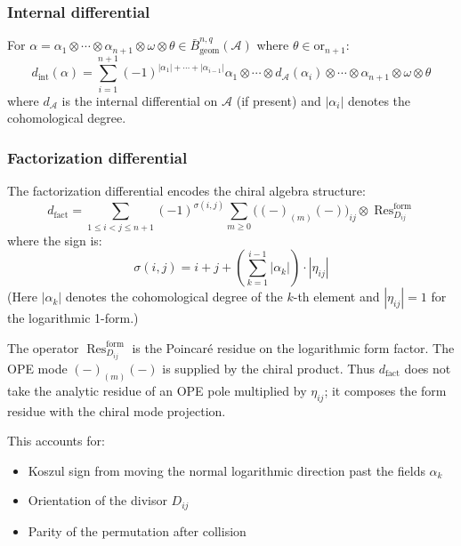\subsubsection{Internal differential}

\begin{definition}
For $\alpha = \alpha_1 \otimes \cdots \otimes \alpha_{n+1} \otimes \omega \otimes \theta \in
\bar{B}^{n,q}_{\text{geom}}(\mathcal{A})$ where $\theta \in \text{or}_{n+1}$:
\[
d_{\text{int}}(\alpha) = \sum_{i=1}^{n+1} (-1)^{|\alpha_1| + \cdots + |\alpha_{i-1}|}
\alpha_1 \otimes \cdots \otimes d_{\mathcal{A}}(\alpha_i) \otimes \cdots \otimes \alpha_{n+1} \otimes \omega \otimes \theta
\]
where $d_{\mathcal{A}}$ is the internal differential on $\mathcal{A}$ (if present) and $|\alpha_i|$ denotes
the cohomological degree.
\end{definition}

\subsubsection{Factorization differential}

\begin{definition}\label{def:diff-fact}
 The factorization differential encodes the chiral algebra structure:
 \[
 d_{\text{fact}}
 =
 \sum_{1 \leq i < j \leq n+1}
 (-1)^{\sigma(i,j)}
 \sum_{m\ge0}
 \bigl((-)_{(m)}(-)\bigr)_{ij}
 \otimes
 \operatorname{Res}^{\mathrm{form}}_{D_{ij}}
 \]
 where the sign is:
 \[\sigma(i,j) = i + j + \left(\sum_{k=1}^{i-1} |\alpha_k|\right) \cdot |\eta_{ij}|\]
 (Here $|\alpha_k|$ denotes the cohomological degree of the $k$-th element and $|\eta_{ij}| = 1$ for the logarithmic 1-form.)

 The operator $\operatorname{Res}^{\mathrm{form}}_{D_{ij}}$ is the
 Poincar\'e residue on the logarithmic form factor. The OPE mode
 $(-)_{(m)}(-)$ is supplied by the chiral product. Thus
 $d_{\text{fact}}$ does not take the analytic residue of an OPE pole
 multiplied by $\eta_{ij}$; it composes the form residue with the
 chiral mode projection.

 This accounts for:
 \begin{itemize}
 \item Koszul sign from moving the normal logarithmic direction past the fields $\alpha_k$
 \item Orientation of the divisor $D_{ij}$
 \item Parity of the permutation after collision
 \end{itemize}
 \end{definition}

